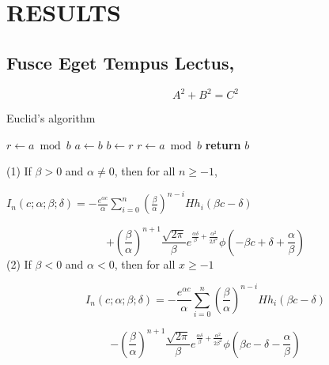 \chapter{RESULTS} \label{results}

\section{Fusce Eget Tempus Lectus, }


\begin{equation}
A^2 + B^2 = C^2
\end{equation}

\begin{algorithm}  {Euclid’s algorithm}
\singlespacing

\begin{algorithmic}[1]
\State $r\gets a\bmod b$
\State $a\gets b$
\State $b\gets r$
\State $r\gets a\bmod b$
\EndWhile\label{euclidendwhile}
\State \textbf{return} $b$
\EndProcedure
\end{algorithmic}
\end{algorithm}










(1) If $\beta>0$ and $\alpha\neq0$, then for all $n\geq-1$,

$I_{n}(c;\alpha; \beta; \delta) = - \frac{e^{\alpha c}}{\alpha} \sum_{i=0}^{n}(\frac{\beta}{\alpha})^{n-i} Hh_{i}(\beta c -\delta)$

$$+ (\frac{\beta}{\alpha})^{n+1} \frac{\sqrt{2 \pi}}{\beta} e^{\frac{\alpha \delta}{\beta}+\frac{\alpha^{2}}{2\beta^{2}}} \phi(-\beta c + \delta + \frac{\alpha}{\beta})$$
(2) If $\beta<0$ and $\alpha<0$, then for all $x \geq -1$

$$I_{n}(c;\alpha; \beta; \delta) = - \frac{e^{\alpha c}}{\alpha} \sum_{i=0}^{n}(\frac{\beta}{\alpha})^{n-i} Hh_{i}(\beta c -\delta)$$

$$- (\frac{\beta}{\alpha})^{n+1} \frac{\sqrt{2 \pi}}{\beta} e^{\frac{\alpha \delta}{\beta}+\frac{\alpha^{2}}{2\beta^{2}}} \phi(\beta c - \delta - \frac{\alpha}{\beta})$$

